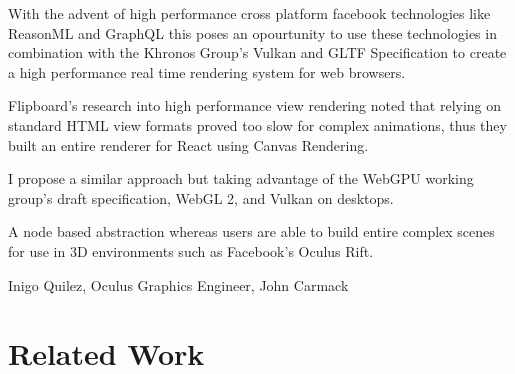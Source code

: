 \documentclass[10pt,a4paper]{article}
\begin{document}

With the advent of high performance cross platform facebook technologies like ReasonML and GraphQL this poses an opourtunity to use these technologies in combination with the Khronos Group's Vulkan and GLTF Specification to create a high performance real time rendering system for web browsers.

Flipboard's research into high performance view rendering noted that relying on standard HTML view formats proved too slow for complex animations, thus they built an entire renderer for React using Canvas Rendering.

I propose a similar approach but taking advantage of the WebGPU working group's draft specification, WebGL 2, and Vulkan on desktops.

A node based abstraction whereas users are able to build entire complex scenes for use in 3D environments such as Facebook's Oculus Rift. 

Inigo Quilez, Oculus Graphics Engineer, John Carmack

\section{Related Work}
\label{sec:relatedwork}


\nocite{*}

\end{document}
